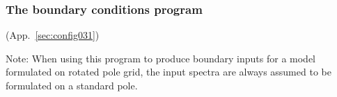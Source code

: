 \vsssub
\subsubsection{The boundary conditions program} \label{sub:ww3bound}
\vsssub

 (App.~\ref{sec:config031})

\vspace{\baselineskip} \noindent
Note: When using this program to produce boundary inputs for a model formulated on rotated pole grid, the input spectra are always assumed to be formulated on a standard pole.

\pb
